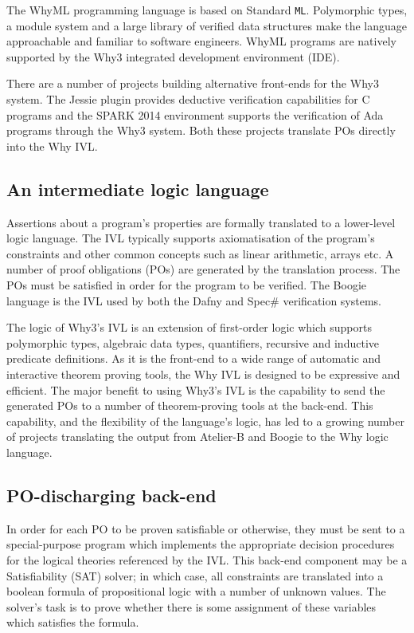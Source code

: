 The WhyML \cite{why:polymorphic} programming language is based on Standard \texttt{ML}. 
Polymorphic types, a module system and a large library of verified data structures make the language approachable and familiar to software engineers.
WhyML programs are natively supported by the \textsf{Why3} integrated development environment (IDE). 

There are a number of projects building alternative front-ends for the \textsf{Why3} system. 
The Jessie plugin \cite{Jessie:manual} provides deductive verification capabilities for C programs and the SPARK 2014 \cite{spark} environment supports the verification of Ada programs through the \textsf{Why3} system. 
Both these projects translate POs directly into the Why IVL.	
	
\subsection{An intermediate logic language} 

Assertions about a program's properties are formally translated to a lower-level logic language.
The IVL typically supports axiomatisation of the program's constraints and other common concepts such as linear arithmetic, arrays etc. A number of proof obligations (POs) are generated by the translation process. 
The POs must be satisfied in order for the program to be verified.
The Boogie language \cite{Boogie} is the IVL used by both the Dafny and Spec\# verification systems.

The logic of \textsf{Why3}'s IVL is an extension of first-order logic which supports polymorphic types, algebraic data types, quantifiers, recursive and inductive predicate definitions.
As it is the front-end to a wide range of automatic and interactive theorem proving tools, the Why IVL is designed to be expressive and efficient.
The major benefit to using \textsf{Why3}'s IVL is the capability to send the generated POs to a number of theorem-proving tools at the back-end.
This capability, and the flexibility of the language's logic, has led to a growing number of projects translating the output from Atelier-B \cite{atelierB2w, rodinplugin} and Boogie \cite{b2w} to the Why logic language.  

\subsection{PO-discharging back-end} 

In order for each PO to be proven satisfiable or otherwise, they must be sent to a special-purpose program which implements the appropriate decision procedures for the logical theories referenced by the IVL. This back-end component may be a Satisfiability (SAT) solver; in which case, all constraints are translated into a boolean formula of propositional logic with a number of unknown values. The solver's task is to prove whether there is some assignment of these variables which satisfies the formula. 
	
